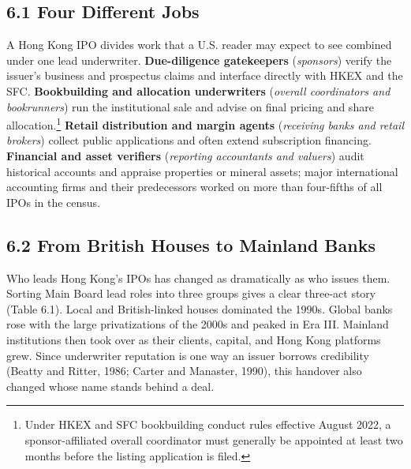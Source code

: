 \documentclass[11pt,letterpaper]{article}
\begin{document}
\subsection*{\texorpdfstring{6.1 Four Different Jobs}{6.1 Four Different Jobs}}
A Hong Kong IPO divides work that a U.S. reader may expect to see combined under one lead underwriter. \textbf{Due-diligence gatekeepers} (\textit{sponsors}) verify the issuer's business and prospectus claims and interface directly with HKEX and the SFC. \textbf{Bookbuilding and allocation underwriters} (\textit{overall coordinators and bookrunners}) run the institutional sale and advise on final pricing and share allocation.\footnote{Under HKEX and SFC bookbuilding conduct rules effective August 2022, a sponsor-affiliated overall coordinator must generally be appointed at least two months before the listing application is filed.} \textbf{Retail distribution and margin agents} (\textit{receiving banks and retail brokers}) collect public applications and often extend subscription financing. \textbf{Financial and asset verifiers} (\textit{reporting accountants and valuers}) audit historical accounts and appraise properties or mineral assets; major international accounting firms and their predecessors worked on more than four-fifths of all IPOs in the census.

\subsection*{\texorpdfstring{6.2 From British Houses to Mainland Banks}{6.2 From British Houses to Mainland Banks}}
Who leads Hong Kong's IPOs has changed as dramatically as who issues them. Sorting Main Board lead roles into three groups gives a clear three-act story (Table 6.1). Local and British-linked houses dominated the 1990s. Global banks rose with the large privatizations of the 2000s and peaked in Era III. Mainland institutions then took over as their clients, capital, and Hong Kong platforms grew. Since underwriter reputation is one way an issuer borrows credibility (Beatty and Ritter, 1986; Carter and Manaster, 1990), this handover also changed whose name stands behind a deal.
\end{document}
